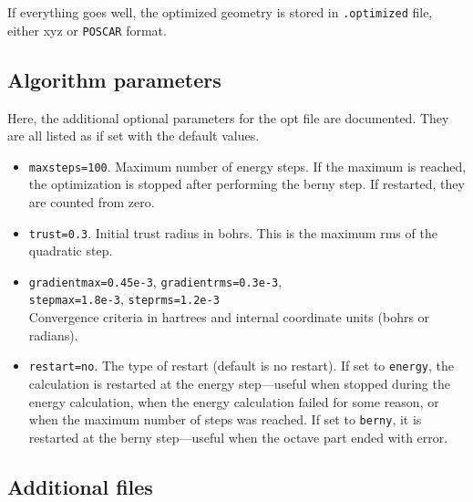 \documentclass[12pt,a4]{article}
\begin{document}
If everything goes well, the optimized geometry is stored in \texttt{.optimized} file, either xyz or \texttt{POSCAR} format.

\subsection{Algorithm parameters}\label{switches}

Here, the additional optional parameters for the opt file are documented. They are all listed as if set with the default values.

\begin{itemize}
\item \texttt{maxsteps=100}. Maximum number of energy steps. If the maximum is reached, the optimization is stopped after performing the berny step. If restarted, they are counted from zero. 
\item \texttt{trust=0.3}. Initial trust radius in bohrs. This is the maximum rms of the quadratic step.
\item \texttt{gradientmax=0.45e-3}, \texttt{gradientrms=0.3e-3},\\
\texttt{stepmax=1.8e-3}, \texttt{steprms=1.2e-3}\\
Convergence criteria in hartrees and internal coordinate units (bohrs or radians).
\item \texttt{restart=no}. The type of restart (default is no restart). If set to \texttt{energy}, the calculation is restarted at the energy step---useful when stopped during the energy calculation, when the energy calculation failed for some reason, or when the maximum number of steps was reached. If set to \texttt{berny}, it is restarted at the berny step---useful when the octave part ended with error.
\end{itemize}

\subsection{Additional files}
\end{document}
